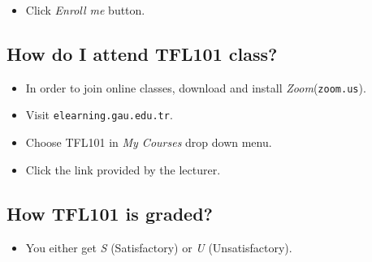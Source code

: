 \documentclass{article}
\begin{document}
\begin{itemize}
	\item Click \textit{Enroll me} button.
\end{itemize}

\begin{figure}[H]
	\centering
\end{figure}



\subsection{How do I attend TFL101 class?}

\begin{itemize}
	\item In order to join online classes, download and install \textit{Zoom}(\texttt{zoom.us}).
	\item Visit \texttt{elearning.gau.edu.tr}.
	\item Choose TFL101 in \textit{My Courses} drop down menu.
	\item Click the link provided by the lecturer.
\end{itemize}

\subsection{How TFL101 is graded?}

\begin{itemize}
	\item You either get \textit{S} (Satisfactory) or \textit{U} (Unsatisfactory).
\end{itemize}
\end{document}
